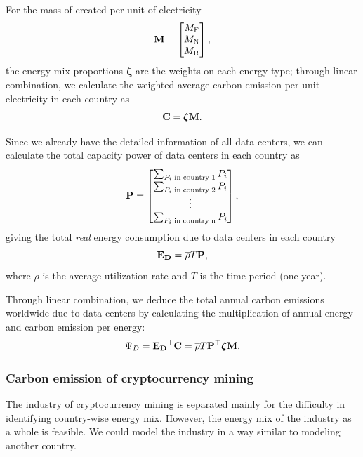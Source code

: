 \documentclass[12pt]{article}
\begin{document}
For the mass of  created per unit of electricity
\begin{equation}
	\vb{M} = \begin{bmatrix}
		M_{\rm F} \\
		M_{\rm N} \\
		M_{\rm R} \\
	\end{bmatrix},
\end{equation}
the energy mix proportions $\boldsymbol{\zeta}$ are the weights on each energy type; through linear combination, we calculate the weighted average carbon emission per unit electricity in each country as
\begin{equation}
	\vb{C} = \boldsymbol{\zeta} \vb{M}.
\end{equation}

Since we already have the detailed information of all data centers, we can calculate the total capacity power of data centers in each country as
\begin{equation}
	\vb{P} = \begin{bmatrix}
		\sum_{P_i \rm\;in\;country\;1} P_i \\
		\sum_{P_i \rm\;in\;country\;2} P_i \\
		\vdots \\
		\sum_{P_i \rm\;in\;country\;n} P_i \\
	\end{bmatrix},
\end{equation}
giving the total \textit{real} energy consumption due to data centers in each country
\begin{equation}
	\vb{E_D} = \overline{\rho} T \vb{P},
\end{equation}
where $\overline{\rho}$ is the average utilization rate and $T$ is the time period (one year).

Through linear combination, we deduce the total annual carbon emissions worldwide due to data centers by calculating the multiplication of annual energy and carbon emission per energy:
\begin{equation}
	\Psi_D = \vb{E_D}^\top \vb{C} = \overline{\rho} T \vb{P}^\top \boldsymbol{\zeta} \vb{M}.
\end{equation}

\subsubsection{Carbon emission of cryptocurrency mining}

The industry of cryptocurrency mining is separated mainly for the difficulty in identifying country-wise energy mix. However, the energy mix of the industry as a whole is feasible. We could model the industry in a way similar to modeling another country.
\end{document}
